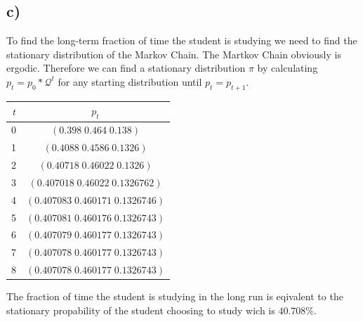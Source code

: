 \subsection*{c)}
To find the long-term fraction of time the student is studying we need to find the stationary distribution of the Markov Chain.
The Martkov Chain obviously is ergodic.
Therefore we can find a stationary distribution $\pi$ by calculating $p_t = p_0 * \mathcal{Q}^t$ for any starting distribution until $p_t = p_{t+1}$.
\begin{center}
  \begin{tabular}{r|c}
    $t$&$p_t$\\\hline
    0&$(0.398\; 0.464\;0.138)$\\
    1&$(0.4088\; 0.4586\;0.1326)$\\
    2&$(0.40718\; 0.46022\;0.1326)$\\
    3&$(0.407018\; 0.46022\;0.1326762)$\\
    4&$(0.407083\; 0.460171\;0.1326746)$\\
    5&$(0.407081\; 0.460176\;0.1326743)$\\
    6&$(0.407079\; 0.460177\;0.1326743)$\\
    7&$(0.407078\; 0.460177\;0.1326743)$\\
    8&$(0.407078\; 0.460177\;0.1326743)$\\
  \end{tabular}
\end{center}
The fraction of time the student is studying in the long run is eqivalent to the stationary propability of the student choosing to study wich is $40.708\%$.